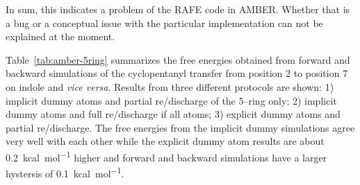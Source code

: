 \documentclass[journal=jctcce,manuscript=suppinfo]{achemso}
\begin{document}
In sum, this indicates a problem of the RAFE code in AMBER.  Whether that is a bug or a conceptual issue with the particular implementation can not be explained at the moment.

Table~\ref{tab:amber-5ring} summarizes the free energies obtained from forward and backward simulations of the cyclopentanyl transfer from position 2 to position 7 on indole and \emph{vice versa}.  Results from three different protocols are shown: 1) implicit dummy atoms and partial re/discharge of the 5--ring only; 2) implicit dummy atoms and full re/discharge if all atoms; 3) explicit dummy atoms and partial re/discharge.  The free energies from the implicit dummy simulations agree very well with each other while the explicit dummy atom results are about \SI{0.2}{kcal.mol^{-1}} higher and forward and backward simulations have a larger hystersis of \SI{0.1}{kcal.mol^{-1}}.
\begin{table}
  \begin{minipage}{\linewidth}
    \caption{Free energies of hydration for the 2--cyclopentanylindole to 7--cyclopentanylindole case with three different protocols.  The data are averages over three runs.}\label{tab:amber-5ring}
  \end{minipage}
\end{table}


\end{document}
